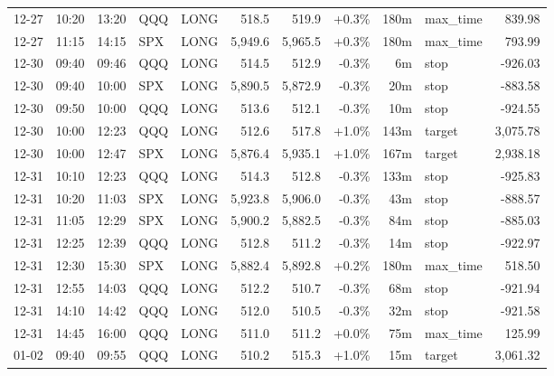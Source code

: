 \documentclass[11pt,a4paper,twoside]{article}
\begin{document}
\begin{center}
\begin{longtable}{>{\color{txtmain}}l l l l l r r r r >{\color{txtmain}}l r}
12-27 & 10:20 & 13:20 & QQQ & LONG & 518.5 & 519.9 & \textcolor{wingreen}{+0.3\%} & 180m & max\_time & \textcolor{wingreen}{839.98} \\
12-27 & 11:15 & 14:15 & SPX & LONG & 5,949.6 & 5,965.5 & \textcolor{wingreen}{+0.3\%} & 180m & max\_time & \textcolor{wingreen}{793.99} \\
12-30 & 09:40 & 09:46 & QQQ & LONG & 514.5 & 512.9 & \textcolor{lossred}{-0.3\%} & 6m & stop & \textcolor{lossred}{-926.03} \\
12-30 & 09:40 & 10:00 & SPX & LONG & 5,890.5 & 5,872.9 & \textcolor{lossred}{-0.3\%} & 20m & stop & \textcolor{lossred}{-883.58} \\
12-30 & 09:50 & 10:00 & QQQ & LONG & 513.6 & 512.1 & \textcolor{lossred}{-0.3\%} & 10m & stop & \textcolor{lossred}{-924.55} \\
12-30 & 10:00 & 12:23 & QQQ & LONG & 512.6 & 517.8 & \textcolor{wingreen}{+1.0\%} & 143m & target & \textcolor{wingreen}{3,075.78} \\
12-30 & 10:00 & 12:47 & SPX & LONG & 5,876.4 & 5,935.1 & \textcolor{wingreen}{+1.0\%} & 167m & target & \textcolor{wingreen}{2,938.18} \\
12-31 & 10:10 & 12:23 & QQQ & LONG & 514.3 & 512.8 & \textcolor{lossred}{-0.3\%} & 133m & stop & \textcolor{lossred}{-925.83} \\
12-31 & 10:20 & 11:03 & SPX & LONG & 5,923.8 & 5,906.0 & \textcolor{lossred}{-0.3\%} & 43m & stop & \textcolor{lossred}{-888.57} \\
12-31 & 11:05 & 12:29 & SPX & LONG & 5,900.2 & 5,882.5 & \textcolor{lossred}{-0.3\%} & 84m & stop & \textcolor{lossred}{-885.03} \\
12-31 & 12:25 & 12:39 & QQQ & LONG & 512.8 & 511.2 & \textcolor{lossred}{-0.3\%} & 14m & stop & \textcolor{lossred}{-922.97} \\
12-31 & 12:30 & 15:30 & SPX & LONG & 5,882.4 & 5,892.8 & \textcolor{wingreen}{+0.2\%} & 180m & max\_time & \textcolor{wingreen}{518.50} \\
12-31 & 12:55 & 14:03 & QQQ & LONG & 512.2 & 510.7 & \textcolor{lossred}{-0.3\%} & 68m & stop & \textcolor{lossred}{-921.94} \\
12-31 & 14:10 & 14:42 & QQQ & LONG & 512.0 & 510.5 & \textcolor{lossred}{-0.3\%} & 32m & stop & \textcolor{lossred}{-921.58} \\
12-31 & 14:45 & 16:00 & QQQ & LONG & 511.0 & 511.2 & \textcolor{wingreen}{+0.0\%} & 75m & max\_time & \textcolor{wingreen}{125.99} \\
01-02 & 09:40 & 09:55 & QQQ & LONG & 510.2 & 515.3 & \textcolor{wingreen}{+1.0\%} & 15m & target & \textcolor{wingreen}{3,061.32} \\

\end{longtable}
\end{center}
\end{document}
